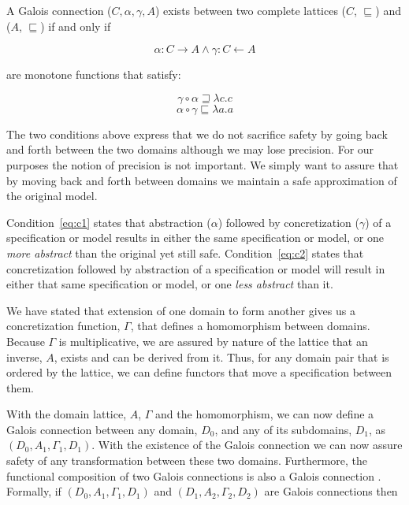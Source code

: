 \documentclass[12pt]{article}
\begin{document}
A Galois connection ($C,\alpha,\gamma,A$) exists between two complete lattices ($C$,
$\sqsubseteq$) and ($A$, $\sqsubseteq$) if and only if

\[\alpha:C \rightarrow A \wedge \gamma:C \leftarrow A\]

\noindent are monotone functions that satisfy:

\begin{equation}
\label{eq:c1}
\gamma \circ \alpha \sqsupseteq \lambda c.c
\end{equation}
\begin{equation}
\label{eq:c2}
\alpha \circ \gamma \sqsubseteq \lambda a.a
\end{equation}

The two conditions above express that we do not sacrifice safety by going back and forth
between the two domains although we may lose precision.  For our purposes the notion of
precision is not important.  We simply want to assure that by moving back and forth
between domains we maintain a safe approximation of the original model.

Condition~\ref{eq:c1} states that abstraction ($\alpha$) followed by concretization
($\gamma$) of a specification or model results in either the same specification or model,
or one \emph{more abstract} than the original yet still safe.  Condition~\ref{eq:c2}
states that concretization followed by abstraction of a specification or model will result
in either that same specification or model, or one \emph{less abstract} than it.

We have stated that extension of one domain to form another gives us a concretization
function, $\Gamma$, that defines a homomorphism between domains.  Because $\Gamma$ is
multiplicative, we are assured by nature of the lattice that an inverse, $A$, exists and
can be derived from it.  Thus, for any domain pair that is ordered by the lattice, we can
define functors that move a specification between them.

With the domain lattice, $A$, $\Gamma$ and the homomorphism, we can now define a Galois
connection between any domain, $D_0$, and any of its subdomains, $D_1$, as
$(D_0,A_1,\Gamma_1,D_1)$.  With the existence of the Galois connection we can now assure
safety of any transformation between these two domains.  Furthermore, the functional
composition of two Galois connections is also a Galois connection
\cite{Nielson:05:Principles-of-P}. Formally, if $(D_0, A_1, \Gamma_1, D_1)$ and $(D_1,
A_2, \Gamma_2,D_2)$ are Galois connections then
\end{document}
